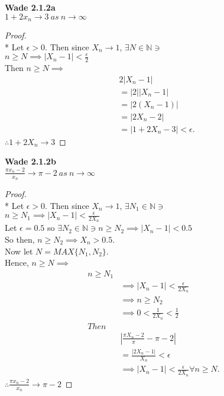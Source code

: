 \documentclass[a4paper]{article}
\newcommand{\nat}{\mathbb{N}}
\begin{document}
\begin{flushleft}

        \textbf{Wade 2.1.2a} \\
        $1 + 2x_n \rightarrow 3\ as\ n \rightarrow \infty$     
        \begin{proof}\mbox{}\\*
            Let $\epsilon > 0$. Then since $X_n \to 1$, $\exists N \in \nat \ni$ \\
            $n \geq N \implies |X_n -1| < \frac{\epsilon}{2}$ \\
            Then $n \geq N \implies$
            \begin{align*}
                & 2|X_n -1| \\
                &= |2||X_n -1| \\
                &= |2(X_n -1)| \\
                &= |2X_n -2| \\
                &= |1 + 2X_n - 3| < \epsilon.
            \end{align*}
            $\therefore 1 + 2X_n \to 3$

        \end{proof}


        \textbf{Wade 2.1.2b} \\
        $\frac{\pi x_n - 2}{x_n} \rightarrow \pi -2\ as\ n \rightarrow \infty$            
        \begin{proof}\mbox{}\\*
            Let $\epsilon > 0$. Then since $X_n \to 1$, $\exists N_1 \in \nat \ni$ \\
            $n \geq N_1 \implies |X_n -1| < \frac{\epsilon}{2X_n}$ \\
            Let $\epsilon = 0.5$ so $\exists N_2 \in \nat \ni n \geq N_2 \implies |X_n -1| < 0.5$ \\
            So then, $n \geq N_2 \implies X_n > 0.5$. \\
            Now let $N = MAX\{N_1, N_2 \}$. \\
            Hence, $n \geq N \implies$
            \begin{align*}
                n \geq N_1 \\
                & \implies |X_n -1| < \frac{\epsilon}{2X_n} \\
                & \implies n \geq N_2 \\
                & \implies 0<\frac{1}{2X_n} < \frac{1}{2} \\
                Then \\
                & \left| \frac{\pi X_n -2}{\pi} - \pi - 2\right| \\
                & = \frac{|2X_n -1|}{X_n} < \epsilon\\
                & \implies |X_n -1| < \frac{\epsilon}{2X_n} \forall n \geq N.
            \end{align*}
            $\therefore \frac{\pi x_n - 2}{x_n} \to \pi -2$
            
        \end{proof}


    \end{flushleft}
\end{document}
